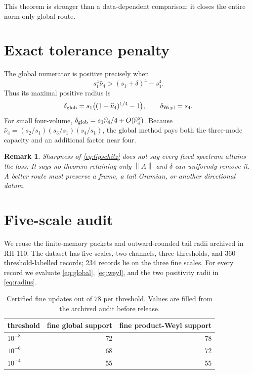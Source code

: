 \documentclass[11pt]{article}
\newtheorem{remark}[theorem]{Remark}
\newcommand{\norm}[1]{\left\lVert#1\right\rVert}
\begin{document}
This theorem is stronger than a data-dependent comparison: it closes the
entire norm-only global route.

\section{Exact tolerance penalty}
The global numerator is positive precisely when
\[
 s_1^4\widehat\nu_4>(s_1+\delta)^4-s_1^4.
\]
Thus its maximal positive radius is
\begin{equation}\label{eq:radius}
 \delta_{\rm glob}=s_1\bigl((1+\widehat\nu_4)^{1/4}-1\bigr),
 \qquad \delta_{\rm Weyl}=s_4.
\end{equation}
For small four-volume,
$\delta_{\rm glob}=s_1\widehat\nu_4/4+O(\widehat\nu_4^2)$.
Because $\widehat\nu_4=(s_2/s_1)(s_3/s_1)(s_4/s_1)$, the global method
pays both the three-mode capacity and an additional factor near four.

\begin{remark}
Sharpness of \eqref{eq:lipschitz} does not say every fixed spectrum attains
the loss.  It says no theorem retaining only $\norm A$ and $\delta$ can
uniformly remove it.  A better route must preserve a frame, a tail Gramian,
or another directional datum.
\end{remark}

\section{Five-scale audit}
We reuse the finite-memory packets and outward-rounded tail radii archived in
RH-110.  The dataset has five scales, two channels, three thresholds, and
360 threshold-labelled records; 234 records lie on the three fine scales.
For every record we evaluate \eqref{eq:global}, \eqref{eq:weyl}, and the two
positivity radii in \eqref{eq:radius}.

\begin{table}[h]
\centering
\begin{tabular}{lrr}
\toprule
threshold & fine global support & fine product-Weyl support\\
\midrule
$10^{-8}$ & 72 & 78\\
$10^{-6}$ & 68 & 72\\
$10^{-4}$ & 55 & 55\\
\bottomrule
\end{tabular}
\caption{Certified fine updates out of 78 per threshold.  Values are filled
from the archived audit before release.}
\end{table}
\end{document}
